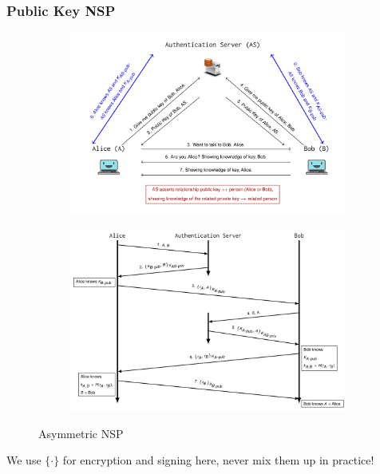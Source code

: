 \subsubsection{Public Key NSP}
\begin{figure}[H]
\centering
\begin{subfigure}{.5\textwidth}
  \centering
  \includegraphics[width=\textwidth]{figures/asymmetric_nsp_1.png}
\end{subfigure}%
\begin{subfigure}{.5\textwidth}
  \centering
  \includegraphics[width=\textwidth]{figures/asymmetric_nsp_2.png}
\end{subfigure}
\caption{Asymmetric NSP}\label{fig:asymmetric_nsp}
\end{figure}
We use $\{\cdot \}$ for encryption and signing here, never mix them up in practice!

